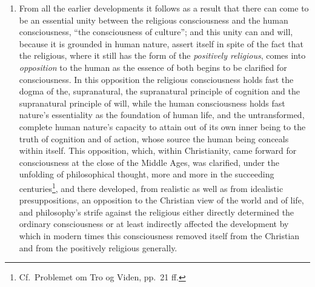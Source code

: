 \documentclass[12pt,a4paper]{book}
\begin{document}
\setcounter{footnote}{0}%
\begin{enumerate}[label=\arabic*., leftmargin=*, labelsep=1em,
                  topsep=0.35\baselineskip, itemsep=0.35\baselineskip]
\item From all the earlier developments it follows as a result that there can
  come to be an essential unity between the religious consciousness and the
  human consciousness, ``the consciousness of culture''; and this unity can and
  will, because it is grounded in human nature, assert itself in spite of the
  fact that the religious, where it still has the form of the \emph{positively
  religious}, comes into \emph{opposition} to the human as the essence of both
  begins to be clarified for consciousness. In this opposition the religious
  consciousness holds fast the dogma of the, supranatural, the supranatural
  principle of cognition and the supranatural principle of will, while the human
  consciousness holds fast nature's essentiality as the foundation of human
  life, and the untransformed, complete human nature's capacity to attain out of
  its own inner being to the truth of cognition and of action, whose source the
  human being conceals within itself. This opposition, which, within
  Christianity, came forward for consciousness at the close of the Middle Ages,
  was clarified, under the unfolding of philosophical thought, more and more in
  the succeeding centuries\footnote{Cf.\ Problemet om Tro og Viden, pp.\ 21
  ff.}, and there developed, from realistic as well as from idealistic
  presuppositions, an opposition to the Christian view of the world and of life,
  and philosophy's strife against the religious either directly determined the
  ordinary consciousness or at least indirectly affected the development by
  which in modern times this
\setcounter{footnote}{0}%
  consciousness removed itself from the Christian and from the positively
  religious generally.


\end{enumerate}
\end{document}
